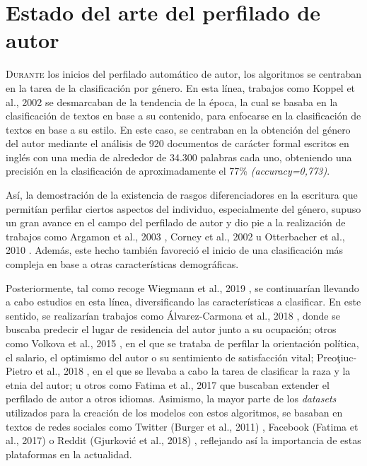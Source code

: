 \chapter{Estado del arte del perfilado de autor}
\label{chap:estadoarte}

\lettrine{D}{urante} los inicios del perfilado automático de autor, los algoritmos se centraban en la tarea de la clasificación por género.
En esta línea, trabajos como Koppel et al., 2002 \cite{koppel2002automatically} se desmarcaban de la tendencia de la época,
la cual se basaba en la clasificación de textos en base a su contenido, para enfocarse en la clasificación de textos en base a su estilo.
En este caso, se centraban en la obtención del género del autor mediante el análisis
de 920 documentos de carácter formal escritos en inglés con una media de alrededor de 34.300 palabras cada uno, obteniendo una precisión en la clasificación de
aproximadamente el 77\% \textit{(accuracy=0,773)}.

\bigskip
Así, la demostración de la existencia de rasgos diferenciadores en la escritura que permitían perfilar ciertos aspectos del individuo, especialmente del género,
supuso un gran avance en el campo del perfilado de autor
y dio pie a la realización de trabajos como Argamon et al., 2003 \cite{argamon2003gender}, Corney et al., 2002 \cite{corney2002gender} u Otterbacher et al., 2010 \cite{otterbacher2010inferring}.
Además, este hecho también favoreció el inicio de una clasificación más compleja en base a otras características demográficas.

\bigskip
Posteriormente, tal como recoge Wiegmann et al., 2019 \cite{wiegmann2019overview}, se continuarían llevando a cabo estudios en esta línea, diversificando
las características a clasificar. En este sentido, se realizarían trabajos como Álvarez-Carmona et al., 2018 \cite{alvarez2018overview}, donde se buscaba
predecir el lugar de residencia del autor junto a su ocupación; otros como Volkova et al., 2015 \cite{volkova2015predicting}, en el que se trataba de perfilar la orientación política,
el salario, el optimismo del autor o su sentimiento de satisfacción vital; Preoţiuc-Pietro et al., 2018 \cite{preoctiuc2018user}, en el que se llevaba a cabo la tarea de
clasificar la raza y la etnia del autor; u otros como Fatima et al., 2017 \cite{fatima2017multilingual} que buscaban extender el perfilado de autor a otros idiomas. Asimismo,
la mayor parte de los \textit{datasets} utilizados para la creación de los modelos con estos algoritmos, se basaban en textos de redes sociales como Twitter (Burger et al., 2011) \cite{burger2011discriminating},
Facebook (Fatima et al., 2017) \cite{fatima2017multilingual} o Reddit (Gjurković et al., 2018) \cite{gjurkovic2018reddit}, reflejando así la importancia de estas plataformas
en la actualidad.


